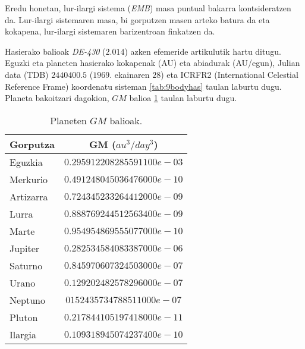 Eredu honetan, lur-ilargi sistema (\emph{EMB}) masa puntual bakarra kontsideratzen da. Lur-ilargi sistemaren masa, bi gorputzen masen arteko batura da eta kokapena, lur-ilargi sistemaren barizentroan finkatzen da.
  
Hasierako balioak \emph{DE-430} ($2.014$) \cite{Folkner2014} azken efemeride artikulutik hartu ditugu. Eguzki eta planeten hasierako kokapenak (AU) eta abiadurak (AU/egun), Julian data (TDB) $2440400.5$ ($1969$. ekainaren $28$) eta ICRFR2 (International Celestial Reference Frame) koordenatu sisteman \ref{tab:9bodyhas} taulan laburtu dugu. Planeta bakoitzari dagokion, $GM$ balioa \ref{tab:9bodymas} taulan laburtu dugu. 

\begin{table}[h]
\caption{Planeten $GM$ balioak.}
\label{tab:9bodymas}       %
\centering
\begin{tabular}{l c }
\hline 
  Gorputza         &  GM ($au^3/day^3$)          \\
  \hline
  Eguzkia          &  $0.295912208285591100e-03$ \\
  Merkurio         &  $0.491248045036476000e-10$ \\
  Artizarra        &  $0.724345233264412000e-09$ \\
  Lurra            &  $0.888769244512563400e-09$ \\
  Marte            &  $0.954954869555077000e-10$ \\
  Jupiter          &  $0.282534584083387000e-06$ \\
  Saturno          &  $0.845970607324503000e-07$ \\
  Urano            &  $0.129202482578296000e-07$ \\
  Neptuno          &  $0152435734788511000e-07$ \\
  Pluton           &  $0.217844105197418000e-11$ \\
  Ilargia          &  $0.109318945074237400e-10$ \\
\hline
\end{tabular}
\end{table}

